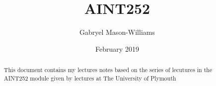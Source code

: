 \documentclass{article}
\title{AINT252}
\author{Gabryel Mason-Williams }
\date{February 2019}
\begin{document}
\def\layersep{2.5cm}
\maketitle
\begin{abstract}
    This document contains my lectures notes based on the series of lecutures in the AINT252 module given by lectures at The University of Plymouth 
\end{abstract}
\newpage
\dominitoc%
\tableofcontents

\newpage

\end{document}
